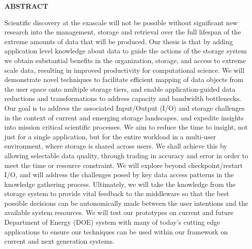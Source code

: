 \vspace{-\belowdisplayskip}
\vspace{-\abovedisplayskip}
\medskip

\begin{center}
\textbf{ABSTRACT}
\end{center}

\vspace{-\belowdisplayskip}

\enlargethispage{2\baselineskip}

Scientific discovery at the exascale will not be possible without significant
new research into the management, storage and retrieval over the full lifespan
of the extreme amounts of data that will be produced. Our thesis is that by
adding application level knowledge about data to guide the actions of the
storage system we obtain substantial benefits in the organization, storage, and
access to extreme scale data, resulting in improved productivity for
computational science. We will demonstrate novel techniques to facilitate
efficient mapping of data objects from the user space onto multiple storage
tiers, and enable application-guided data reductions and transformations to
address capacity and bandwidth bottlenecks.  Our goal is to address the
associated Input/Output (I/O) and storage challenges in the context of current
and emerging storage landscapes, and expedite insights into mission critical
scientific processes.  We aim to reduce the time to insight, not just for a
single application, but for the entire workload in a multi-user environment,
where storage is shared across users. We shall achieve this by allowing
selectable data quality, through trading in accuracy and error in order to meet
the time or resource constraint. We will explore beyond checkpoint/restart I/O,
and will address the challenges posed by key data access patterns in the
knowledge gathering process. Ultimately, we will take the knowledge from the
storage system to provide vital feedback to the middleware so that the best
possible decisions can be autonomically made between the user intentions and
the available system resources.  We will test our prototypes on current and
future Department of Energy (DOE) system with many of today's cutting edge
applications to ensure our techniques can be used within our framework on
current and next generation systems.

\noindent

\vfill
